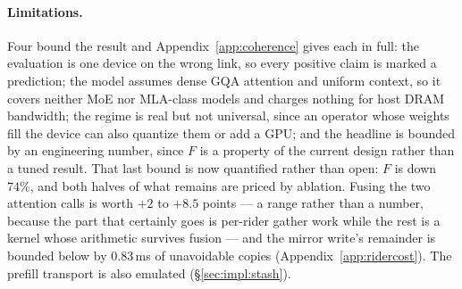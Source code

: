 \paragraph{Limitations.} Four bound the result and
Appendix~\ref{app:coherence} gives each in full: the evaluation is one device on the
wrong link, so every positive claim is marked a prediction; the model assumes dense
GQA attention and uniform context, so it covers neither MoE nor MLA-class models and
charges nothing for host DRAM bandwidth; the regime is real but not universal, since
an operator whose weights fill the device can also quantize them or add a GPU; and
the headline is bounded by an engineering number, since $F$ is a property of the
current design rather than a tuned result. That last bound is now quantified rather
than open: $F$ is down $74\%$, and both halves of what remains are priced by
ablation. Fusing the two attention calls is worth $+2$ to $+8.5$ points --- a range
rather than a number, because the part that certainly goes is per-rider gather work
while the rest is a kernel whose arithmetic survives fusion --- and the mirror
write's remainder is bounded below by $0.83$\,ms of unavoidable copies
(Appendix~\ref{app:ridercost}). The prefill transport is also emulated
(\S\ref{sec:impl:stash}).

